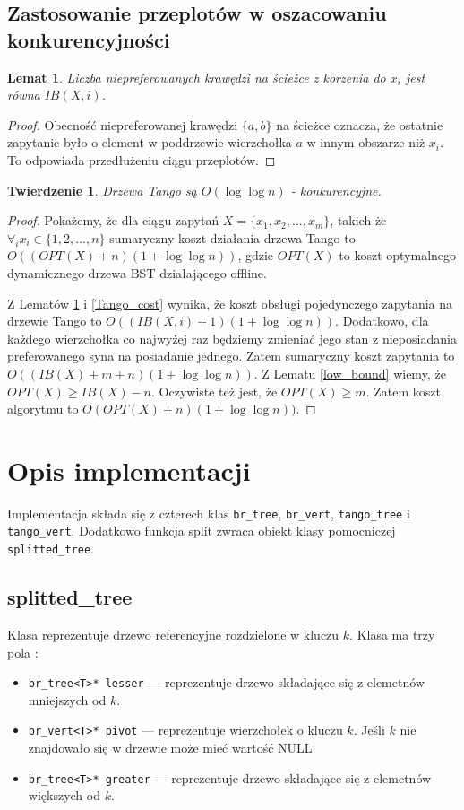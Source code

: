 \documentclass[declaration,shortabstract]{iithesis}
\newcounter{thm}[section]
\theoremstyle{thm}
\theoremstyle{remark}
\theoremstyle{plain}
\newtheorem{theorem}[thm]{Twierdzenie}
\theoremstyle{plain}
\theoremstyle{plain}
\newtheorem{lemma}[thm]{Lemat}
\begin{document}
\subsection{Zastosowanie przeplotów w oszacowaniu konkurencyjności} 
\begin{lemma}
\label{num_switch} 
Liczba niepreferowanych krawędzi na ścieżce z korzenia do \(x_i\) jest równa \(IB(X, i)\). 
\end{lemma} 
\begin{proof} 
Obecność niepreferowanej krawędzi \( \{a, b\}\) na ścieżce oznacza, że ostatnie zapytanie było o element w poddrzewie wierzchołka $a$ w innym obszarze niż \(x_i\). To odpowiada przedłużeniu ciągu przeplotów. 
\end{proof}  

\begin{theorem} 
Drzewa Tango są \( O(\log \log n)\) - konkurencyjne. 
\end{theorem} 
\begin{proof} 
Pokażemy, że dla ciągu zapytań \(X = \{x_1, x_2,..., x_m\}\), takich że \( \forall_i x_i \in \{1, 2, ..., n\}\) sumaryczny koszt działania drzewa Tango to \( O((OPT(X) + n)(1 + \log \log n))\), gdzie \(OPT(X)\) to koszt optymalnego dynamicznego drzewa BST działającego offline. 

Z Lematów \ref{num_switch} i \ref{Tango_cost} wynika, że koszt obsługi pojedynczego zapytania na drzewie Tango to \(O((IB(X, i)+1)(1+\log \log n))\). Dodatkowo, dla każdego wierzchołka co najwyżej raz będziemy zmieniać jego stan z nieposiadania preferowanego syna na posiadanie jednego. Zatem sumaryczny koszt zapytania to \(O((IB(X)+m +n )(1+\log \log n))\). Z Lematu \ref{low_bound} wiemy, że \(OPT(X) \geq IB(X) - n\). Oczywiste też jest, że \(OPT(X) \geq m\). Zatem koszt algorytmu to \(O(OPT(X)+n )(1+\log \log n))\). 
\end{proof}  

\section{Opis implementacji} 

Implementacja składa się z czterech klas \texttt{br\_tree}, \texttt{br\_vert}, \texttt{tango\_tree} i \\\texttt{tango\_vert}. Dodatkowo funkcja split zwraca obiekt klasy pomocniczej  \texttt{splitted\_tree}.

\subsection{splitted\_tree}
Klasa reprezentuje drzewo referencyjne rozdzielone w kluczu $k$. Klasa ma trzy pola : 
\begin{itemize}
\item{\texttt{br\_tree<T>* lesser} --- reprezentuje drzewo składające się z elemetnów mniejszych od $k$.}
\item{\texttt{br\_vert<T>* pivot} --- reprezentuje wierzchołek o kluczu $k$. Jeśli $k$ nie znajdowało się w drzewie może mieć wartość NULL}
\item{\texttt{br\_tree<T>* greater} --- reprezentuje drzewo składające się z elemetnów większych od $k$.}
\end{itemize}
\end{document}
